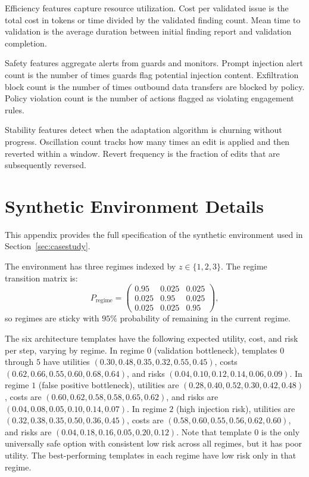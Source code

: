 \documentclass[sigconf,anonymous]{acmart}
\newcommand{\secref}[1]{Section~\ref{#1}}
\begin{document}
Efficiency features capture resource utilization. Cost per validated issue is the total cost in tokens or time divided by the validated finding count. Mean time to validation is the average duration between initial finding report and validation completion.

Safety features aggregate alerts from guards and monitors. Prompt injection alert count is the number of times guards flag potential injection content. Exfiltration block count is the number of times outbound data transfers are blocked by policy. Policy violation count is the number of actions flagged as violating engagement rules.

Stability features detect when the adaptation algorithm is churning without progress. Oscillation count tracks how many times an edit is applied and then reverted within a window. Revert frequency is the fraction of edits that are subsequently reversed.

\section{Synthetic Environment Details}
\label{app:synthetic}

This appendix provides the full specification of the synthetic environment used in \secref{sec:casestudy}.

The environment has three regimes indexed by $z \in \{1, 2, 3\}$. The regime transition matrix is:
\begin{equation}
P_{\text{regime}} = \begin{pmatrix}
0.95 & 0.025 & 0.025 \\
0.025 & 0.95 & 0.025 \\
0.025 & 0.025 & 0.95
\end{pmatrix},
\end{equation}
so regimes are sticky with $95\%$ probability of remaining in the current regime.

The six architecture templates have the following expected utility, cost, and risk per step, varying by regime. In regime $0$ (validation bottleneck), templates $0$ through $5$ have utilities $(0.30, 0.48, 0.35, 0.32, 0.55, 0.45)$, costs $(0.62, 0.66, 0.55, 0.60, 0.68, 0.64)$, and risks $(0.04, 0.10, 0.12, 0.14, 0.06, 0.09)$. In regime $1$ (false positive bottleneck), utilities are $(0.28, 0.40, 0.52, 0.30, 0.42, 0.48)$, costs are $(0.60, 0.62, 0.58, 0.58, 0.65, 0.62)$, and risks are $(0.04, 0.08, 0.05, 0.10, 0.14, 0.07)$. In regime $2$ (high injection risk), utilities are $(0.32, 0.38, 0.35, 0.50, 0.36, 0.45)$, costs are $(0.58, 0.60, 0.55, 0.56, 0.62, 0.60)$, and risks are $(0.04, 0.18, 0.16, 0.05, 0.20, 0.12)$. Note that template $0$ is the only universally safe option with consistent low risk across all regimes, but it has poor utility. The best-performing templates in each regime have low risk only in that regime.
\end{document}
